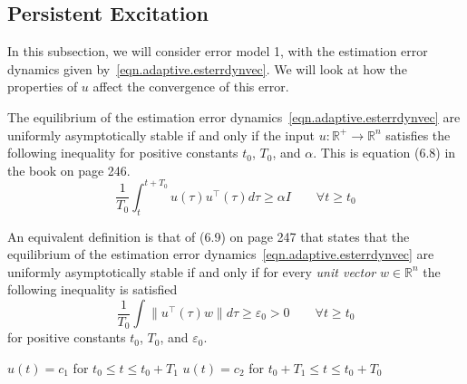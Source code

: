 \subsection{Persistent Excitation}

In this subsection, we will consider error model 1, with the estimation error dynamics given by~\eqref{eqn.adaptive.esterrdynvec}.
We will look at how the properties of $u$ affect the convergence of this error.

The equilibrium of the estimation error dynamics~\eqref{eqn.adaptive.esterrdynvec} are uniformly asymptotically stable if and only if the input $u:\mathbb{R}^{+}\rightarrow\mathbb{R}^{n}$ satisfies the following inequality for positive constants $t_{0}$, $T_{0}$, and $\alpha$.
This is equation (6.8) in the book on page 246.
\begin{equation*}
  \frac{1}{T_{0}}\int_{t}^{t+T_{0}}u(\tau)u^{\top}(\tau)d\tau\geq\alpha I
  \qquad
  \forall t\geq t_{0}
\end{equation*}

An equivalent definition is that of (6.9) on page 247 that states that the equilibrium of the estimation error dynamics~\eqref{eqn.adaptive.esterrdynvec} are uniformly asymptotically stable if and only if for every \textit{unit vector} $w\in\mathbb{R}^{n}$ the following inequality is satisfied
\begin{equation*}
  \frac{1}{T_{0}}\int \|u^{\top}(\tau)w\|d\tau\geq\varepsilon_{0}>0
  \qquad
  \forall t\geq t_{0}
\end{equation*}
for positive constants $t_{0}$, $T_{0}$, and $\varepsilon_{0}$.

$u(t)=c_{1}$ for $t_{0}\leq t\leq t_{0}+T_{1}$
$u(t)=c_{2}$ for $t_{0}+T_{1}\leq t\leq t_{0}+T_{0}$


